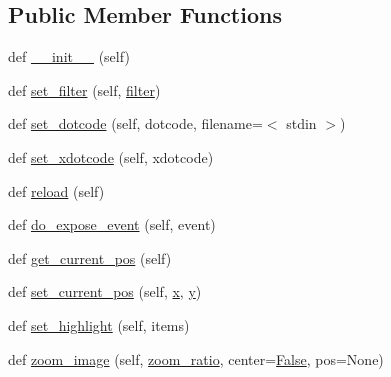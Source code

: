 \subsection*{Public Member Functions}
\begin{DoxyCompactItemize}
\item 
def \hyperlink{classsmacc__viewer_1_1xdot_1_1xdot_1_1DotWidget_ab966dcc89fe9ad9918b68d02296e4ad1}{\+\_\+\+\_\+init\+\_\+\+\_\+} (self)
\item 
def \hyperlink{classsmacc__viewer_1_1xdot_1_1xdot_1_1DotWidget_a515a2b738adf64b7f85077532eeb2b06}{set\+\_\+filter} (self, \hyperlink{classsmacc__viewer_1_1xdot_1_1xdot_1_1DotWidget_ad0407b9aa639144d8681497d2b643705}{filter})
\item 
def \hyperlink{classsmacc__viewer_1_1xdot_1_1xdot_1_1DotWidget_ab824941e96366c2317bae9ae050c222f}{set\+\_\+dotcode} (self, dotcode, filename=\textquotesingle{}$<$ stdin $>$\textquotesingle{})
\item 
def \hyperlink{classsmacc__viewer_1_1xdot_1_1xdot_1_1DotWidget_a65e9fda7d32b70ae4e4df83f01e9ddd1}{set\+\_\+xdotcode} (self, xdotcode)
\item 
def \hyperlink{classsmacc__viewer_1_1xdot_1_1xdot_1_1DotWidget_ad65916bccc16b7a559ced00059d1f256}{reload} (self)
\item 
def \hyperlink{classsmacc__viewer_1_1xdot_1_1xdot_1_1DotWidget_a3690e9f6b0b3f7f99c30b237b38cdde6}{do\+\_\+expose\+\_\+event} (self, event)
\item 
def \hyperlink{classsmacc__viewer_1_1xdot_1_1xdot_1_1DotWidget_a06a2b2c64d066b252f3e5602adb9bf7c}{get\+\_\+current\+\_\+pos} (self)
\item 
def \hyperlink{classsmacc__viewer_1_1xdot_1_1xdot_1_1DotWidget_a5484f2841129a64d8070be368a90e0bf}{set\+\_\+current\+\_\+pos} (self, \hyperlink{classsmacc__viewer_1_1xdot_1_1xdot_1_1DotWidget_a828aac52a08d67c493696b074b6326da}{x}, \hyperlink{classsmacc__viewer_1_1xdot_1_1xdot_1_1DotWidget_a1f5ee9fba6b3fe02772831d9bf6d7481}{y})
\item 
def \hyperlink{classsmacc__viewer_1_1xdot_1_1xdot_1_1DotWidget_a982ea8087a83b3bf41d3efdb5edd6539}{set\+\_\+highlight} (self, items)
\item 
def \hyperlink{classsmacc__viewer_1_1xdot_1_1xdot_1_1DotWidget_a59e85f20fa9e43ffdeb3a3982061ca5d}{zoom\+\_\+image} (self, \hyperlink{classsmacc__viewer_1_1xdot_1_1xdot_1_1DotWidget_a61694eba4278e9726bbef68a9ca3f594}{zoom\+\_\+ratio}, center=\hyperlink{namespacesmacc__viewer_a5928e8da279785cbab9011356c3eaa87}{False}, pos=None)
\item 

\end{DoxyCompactItemize}
